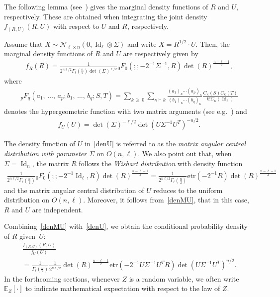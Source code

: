\documentclass[AHL,Unicode,longabstracts,published]{cedram}
\DeclareMathOperator{\Id}{Id}
\newcommand{\scN}{\mathscr{N}}
\newcommand{\EX}[2]{\mathbb{E}_{#1}\left[#2\right]}
\newcommand{\Hyp}[5]{{}_{#1}F_{#3}\left(#2;#4;#5\right)}
\newcommand{\etr}[1]{\mathrm{etr}\left(#1\right)}
\begin{document}
The following lemma (see~\cite[Theorem~2.4.2]{Ch2012}) gives the marginal density functions of $R$ and $U$, respectively. These are obtained when integrating the joint density $f_{(R,U)}(R,U)$ with respect to $U$ and $R$, respectively.
\begin{lemm}[{\cite[Theorem~2.4.2]{Ch2012}}]
Assume that $X \sim \scN_{\ell \times n}(0,\Id_{\ell} \otimes \Sigma)$ and write $X = R^{1/2} \cdot U$. Then, the marginal density functions of $R$ and $U$ are respectively given by
\begin{gather}\label{denM}
f_R(R)= \frac{1}{2^{n\ell/2} \Gamma_{\ell}\left(\frac{n}{2}\right) \det(\Sigma)^{\ell/2}} \Hyp{0}{}{0}{}{-2^{-1}\Sigma^{-1},R} \det(R)^{\frac{n-\ell-1}{2}},
\end{gather}
where
\begin{gather*}
\Hyp{p}{a_1,\,\ldots,\,a_p}{q}{b_1,\,\ldots,\,b_q}{S,T}=
\sum_{k\,\geq\,0}\sum_{\kappa \vdash k} \frac{(a_1)_{\kappa}\cdots (a_p)_{\kappa}}{(b_1)_{\kappa}\cdots (b_q)_{\kappa}} \frac{C_{\kappa}(S)C_{\kappa}(T)}{k!C_{\kappa}(\Id_{\ell})}
\end{gather*}
denotes the hypergeometric function with two matrix arguments (see e.g.~\cite[Appendix~A.6]{Ch2012}) and
\begin{gather}\label{denU}
f_U(U)= \det(\Sigma)^{-\ell/2}\det\left(U\Sigma^{-1}U^T\right)^{-n/2}.
\end{gather}
\end{lemm}
The density function of $U$ in~\eqref{denU} is referred to as the \emph{matrix angular central distribution with parameter} $\Sigma$ on $O(n,\ell)$. We also point out that, when $\Sigma=\Id_n$, the matrix $R$ follows the \emph{Wishart distribution} with density function
\begin{gather*}
\frac{1}{2^{n\ell/2} \Gamma_{\ell}\left(\frac{n}{2}\right)} \Hyp{0}{}{0}{}{-2^{-1}\Id_{\ell},R} \det(R)^{\frac{n-\ell-1}{2}} = \frac{1}{2^{n\ell/2} \Gamma_{\ell}\left(\frac{n}{2}\right)}
\etr{-2^{-1}R}\det(R)^{\frac{n-\ell-1}{2}}
\end{gather*}
and the matrix angular central distribution of $U$ reduces to the uniform distribution on $O(n,\ell)$. Moreover, it follows from~\eqref{denMU}, that in this case, $R$ and $U$ are independent.

\noindent Combining~\eqref{denMU} with~\eqref{denU}, we obtain the conditional probability density of $R$ given~$U$:
\begin{multline}\label{MgivenU}
\frac{f_{(R,U)}(R,U)}{f_U(U)} \\
= \frac{1}{\Gamma_{\ell}(\frac{n}{2})}
\frac{1}{2^{n\ell/2}} \det(R)^{\frac{n-\ell-1}{2}}
\etr{ -2^{-1}U\Sigma^{-1}U^TR} \det\left(U\Sigma^{-1}U^T\right)^{ n/2}.
\end{multline}
In the forthcoming sections, whenever $Z$ is a random variable, we often write $\EX{Z}{\cdot} $ to indicate mathematical expectation with respect to the law of $Z$.
\end{document}
